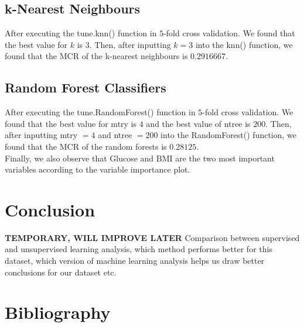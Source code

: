 \documentclass[12pt]{article}
\begin{document}
\subsection{k-Nearest Neighbours}

After executing the tune.knn() function in $5$-fold cross validation. We found that the best value for $k$ is $3$. Then, after inputting $k=3$ into the knn() function, we found that the MCR of the k-nearest neighbours is $0.2916667$.

\subsection{Random Forest Classifiers}

After executing the tune.RandomForest() function in $5$-fold cross validation. We found that the best value for mtry is $4$ and the best value of ntree is $200$. Then, after inputting mtry $=4$ and ntree $=200$ into the RandomForest() function, we found that the MCR of the random forests is $0.28125$. \\
Finally, we also observe that Glucose and BMI are the two most important variables according to the variable importance plot.



\section{Conclusion}

\textbf{TEMPORARY, WILL IMPROVE LATER} Comparison between supervised and unsupervised learning analysis, which method performs better for this dataset, which version of machine learning analysis helps us draw better conclusions for our dataset etc. 

 \section{Bibliography}
  
 
\end{document}
